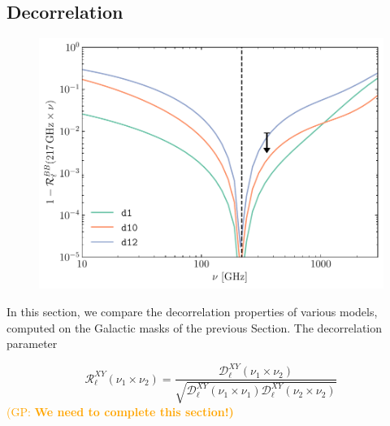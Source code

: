 \documentclass[twocolumn]{aastex631}
\newcommand{\giuse}[1]{\textcolor{orange}{(GP: #1)}}
\begin{document}

\subsection{Decorrelation}

\begin{figure}
    \centering
    \includegraphics[width=\columnwidth]{figures/decorrelation_dust.pdf}
    \caption{}
    \label{fig:decorrelation}
\end{figure}

In this section, we compare the decorrelation properties of various models, computed on the Galactic masks of the previous Section. The decorrelation parameter

\begin{equation}
    \mathcal{R}^{XY}_\ell(\nu_1\times\nu_2) = \frac{\mathcal{D}_\ell^{XY}(\nu_1\times\nu_2)}{\sqrt{\mathcal{D}_\ell^{XY}(\nu_1\times\nu_1)\mathcal{D}_\ell^{XY}(\nu_2\times\nu_2)}}
\end{equation}
\giuse{\bf We need to complete this section!}
\end{document}
